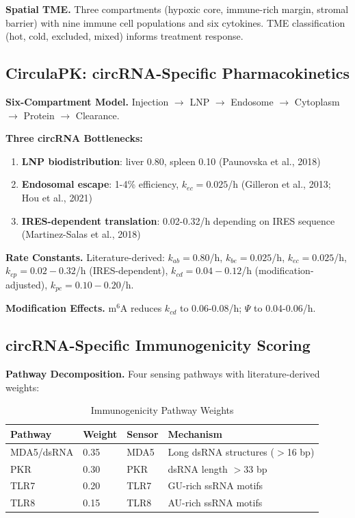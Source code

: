 \documentclass[12pt,a4paper]{article}
\begin{document}
\textbf{Spatial TME.} Three compartments (hypoxic core, immune-rich margin, stromal barrier) with nine immune cell populations and six cytokines. TME classification (hot, cold, excluded, mixed) informs treatment response.

\subsection{CirculaPK: circRNA-Specific Pharmacokinetics}

\textbf{Six-Compartment Model.} Injection $\rightarrow$ LNP $\rightarrow$ Endosome $\rightarrow$ Cytoplasm $\rightarrow$ Protein $\rightarrow$ Clearance.

\textbf{Three circRNA Bottlenecks:}

\begin{enumerate}
\item \textbf{LNP biodistribution}: liver 0.80, spleen 0.10 (Paunovska et al., 2018)
\item \textbf{Endosomal escape}: 1-4\% efficiency, $k_{ec} = 0.025$/h (Gilleron et al., 2013; Hou et al., 2021)
\item \textbf{IRES-dependent translation}: 0.02-0.32/h depending on IRES sequence (Martinez-Salas et al., 2018)
\end{enumerate}

\textbf{Rate Constants.} Literature-derived: $k_{ab}=0.80$/h, $k_{be}=0.025$/h, $k_{ec}=0.025$/h, $k_{cp}=0.02-0.32$/h (IRES-dependent), $k_{cd}=0.04-0.12$/h (modification-adjusted), $k_{pc}=0.10-0.20$/h.

\textbf{Modification Effects.} m$^6$A reduces $k_{cd}$ to 0.06-0.08/h; $\Psi$ to 0.04-0.06/h.

\subsection{circRNA-Specific Immunogenicity Scoring}

\textbf{Pathway Decomposition.} Four sensing pathways with literature-derived weights:

\begin{table}[htbp]
\centering
\caption{Immunogenicity Pathway Weights}
\label{tab:pathways}
\begin{tabular}{llll}
\toprule
Pathway & Weight & Sensor & Mechanism \\
\midrule
MDA5/dsRNA & 0.35 & MDA5 & Long dsRNA structures ($>$16 bp) \\
PKR & 0.30 & PKR & dsRNA length $>$33 bp \\
TLR7 & 0.20 & TLR7 & GU-rich ssRNA motifs \\
TLR8 & 0.15 & TLR8 & AU-rich ssRNA motifs \\
\bottomrule
\end{tabular}
\end{table}
\end{document}
